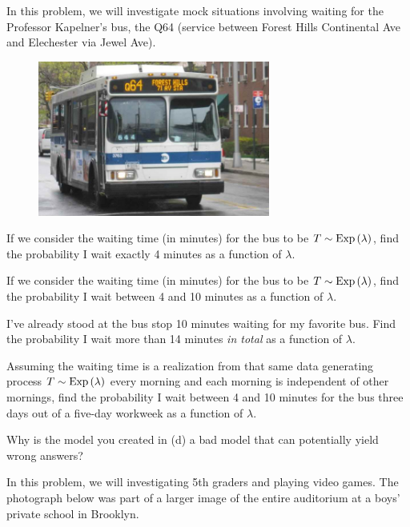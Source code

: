 \documentclass[12pt]{article}
\begin{document}
\problem In this problem, we will investigate mock situations involving waiting for the Professor Kapelner's  bus, the Q64 (service between Forest Hills Continental Ave and Elechester via Jewel Ave).

\begin{figure}[h]
\begin{center}
\includegraphics[width=3in]{q64.png}
\end{center}
\end{figure}

\benum
{} If we consider the waiting time (in minutes) for the bus to be $T \sim \mathrm{Exp}\left(\lambda\right)$, find the probability I wait exactly 4 minutes as a function of $\lambda$. 

 If we consider the waiting time (in minutes) for the bus to be $T \sim \mathrm{Exp}\left(\lambda\right)$, find the probability I wait between 4 and 10 minutes as a function of $\lambda$. 

 I've already stood at the bus stop 10 minutes waiting for my favorite bus. Find the probability I wait more than 14 minutes \textit{in total} as a function of $\lambda$. 

 Assuming the waiting time is a realization from that same data generating process $T \sim \mathrm{Exp}\left(\lambda\right)$ every morning and each morning is independent of other mornings, find the probability I wait between 4 and 10 minutes for the bus three days out of a five-day workweek as a function of $\lambda$. 

 Why is the model you created in (d) a bad model that can potentially yield wrong answers? 

\eenum



\problem In this problem, we will investigating 5th graders and playing video games. The photograph below was part of a larger image of the entire auditorium at a boys' private school in Brooklyn. 
\end{document}
